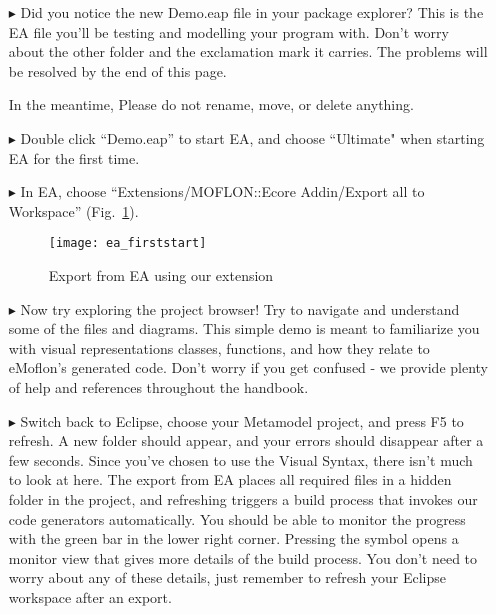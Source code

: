 \newpage
\visHeader
{}

\begin{itemize}
\FloatBarrier
\item[$\blacktriangleright$] Did you notice the new Demo.eap file in your package explorer? This is the EA file you'll be testing and modelling your program with. Don't worry about the other folder and the exclamation mark it carries. The problems will be resolved by the end of this page.

In the meantime, Please do not rename, move, or delete anything.

\item[$\blacktriangleright$] Double click ``Demo.eap'' to start EA, and choose ``Ultimate" when starting EA for the first time.

\item[$\blacktriangleright$] In EA, choose ``Extensions/MOFLON::Ecore Addin/Export\- all\- to\- Workspace'' (Fig.~\ref{fig_ea}).

\vspace{1cm}

\begin{figure}[htbp]
	\centering
  \texttt{[image: ea\_firststart]}
	\caption{Export from EA using our extension} 
	\label{fig_ea} 
\end{figure}

\vspace{1cm}

\item[$\blacktriangleright$] Now try exploring the project browser! Try to navigate and understand some of the files and diagrams. This simple demo is meant to familiarize you with visual representations classes, functions, and how they relate to eMoflon's generated code. Don't worry if you get confused - we provide plenty of help and references throughout the handbook.
  
\item[$\blacktriangleright$] Switch back to Eclipse, choose your Metamodel project, and press F5 to refresh. A new folder should appear, and your errors should disappear after a few seconds. Since you've chosen to use the Visual Syntax, there isn't much to look at here. The export from EA places all required files in a hidden folder in the project, and refreshing triggers a build process that invokes our code generators automatically. 
You should be able to monitor the progress with the green bar in the lower right corner. Pressing the symbol opens a monitor view that gives more details of the build process. You don't need to worry about any of these details, just remember to refresh your Eclipse workspace after an export.

\end{itemize}

\fancyfoot{}
